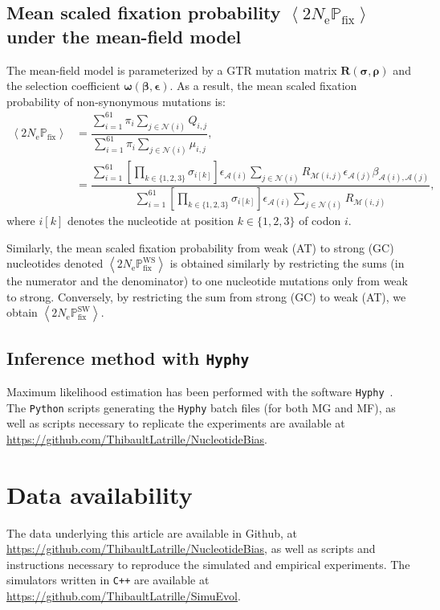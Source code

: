 \documentclass{article}
\newcommand{\UniDimArray}[1]{\bm{#1}}
\newcommand{\BiDimArray}[1]{\bm{#1}}
\newcommand{\Ne}{N_{\text{e}}}
\newcommand{\proba}{\mathbb{P}}
\newcommand{\Pfix}{2 \Ne \proba_{\text{fix}}}
\newcommand{\mutmatrix}{R}
\newcommand{\Mutmatrix}{\BiDimArray{\mutmatrix}}
\newcommand{\exchan}{\rho}
\newcommand{\Exchan}{\UniDimArray{\exchan}}
\newcommand{\mutequi}{\sigma}
\newcommand{\Mutequi}{\UniDimArray{\mutequi}}
\newcommand{\ci}{{i}}
\newcommand{\cj}{{j}}
\newcommand{\sumOverCodons}{_{\ci=1}^{61}}
\newcommand{\itoj}{\ci, \cj}
\newcommand{\nuc}{\mathcal{M}}
\newcommand{\nucitoj}{\nuc(\itoj)}
\newcommand{\subequi}{\pi}
\newcommand{\aaMap}{\mathcal{A}}
\newcommand{\aai}{\aaMap(\ci)}
\newcommand{\aaj}{\aaMap(\cj)}
\newcommand{\avgpfix}{\left\langle \Pfix \right\rangle }
\newcommand{\avgpfixATtoGC}{\left\langle \Pfix^{\text{WS}} \right\rangle }
\newcommand{\avgpfixGCtoAT}{\left\langle \Pfix^{\text{SW}} \right\rangle }
\newcommand{\AAexchan}{\beta}
\newcommand{\AAExchan}{\UniDimArray{\AAexchan}}
\newcommand{\AAequi}{\epsilon}
\newcommand{\AAEqui}{\UniDimArray{\AAequi}}
\newcommand{\NonSynNeighbors}{\mathcal{N}}
\newcommand{\setNonSynNeighbors}{\NonSynNeighbors\left(\ci\right)}
\begin{document}
\subsection{Mean scaled fixation probability $\avgpfix$ under the mean-field model}
\label{sec:mut-bias-mean-field-omega}
The mean-field model is parameterized by a {GTR} mutation matrix $\Mutmatrix(\Mutequi, \Exchan)$ and the selection coefficient $\UniDimArray{\omega}(\AAExchan, \AAEqui)$.
As a result, the mean scaled fixation probability of {non-synonymous} mutations is:
\begin{align}
 \avgpfix & = \dfrac{ \sum\limits\sumOverCodons \subequi_{\ci} \sum\limits_{\cj \in \setNonSynNeighbors} Q_{\itoj}}{ \sum\limits\sumOverCodons \subequi_{\ci} \sum\limits_{\cj \in \setNonSynNeighbors} \mu_{\itoj}}, \\
 & = \dfrac{ \sum\limits\sumOverCodons \left[\prod\limits_{k \in \{ 1, 2, 3 \}} \mutequi_{\ci[k]}\right] \AAequi_{\aai} \sum\limits_{\cj \in \setNonSynNeighbors} \mutmatrix_{\nucitoj} \AAequi_{\aaj} \AAexchan_{\aai, \aaj} }{\sum\limits\sumOverCodons \left[\prod\limits_{k \in \{ 1, 2, 3 \}} \mutequi_{\ci[k]}\right] \AAequi_{\aai} \sum\limits_{\cj \in \setNonSynNeighbors} \mutmatrix_{\nucitoj}},
\end{align}
where $\ci[k]$ denotes the nucleotide at position $k \in \{ 1, 2, 3 \}$ of codon $i$.

Similarly, the mean scaled fixation probability from weak (AT) to strong (GC) nucleotides denoted $\avgpfixATtoGC$ is obtained similarly by restricting the sums (in the numerator and the denominator) to one nucleotide mutations only from weak to strong.
Conversely, by restricting the sum from strong (GC) to weak (AT), we obtain $\avgpfixGCtoAT$.

\subsection{Inference method with \texttt{Hyphy}}
\label{subsec:inference-method-with-hyphy}

Maximum {likelihood} estimation has been performed with the software \texttt{Hyphy}~\citep{Pond2005}.
The \texttt{Python} scripts generating the \texttt{Hyphy} batch files (for both MG and MF), as well as scripts necessary to replicate the experiments are available at \url{https://github.com/ThibaultLatrille/NucleotideBias}.

\section{Data availability}
The data underlying this article are available in Github, at \url{https://github.com/ThibaultLatrille/NucleotideBias}, as well as scripts and instructions necessary to reproduce the simulated and empirical experiments.
The simulators written in \texttt{C++} are available at \url{https://github.com/ThibaultLatrille/SimuEvol}.
\end{document}
